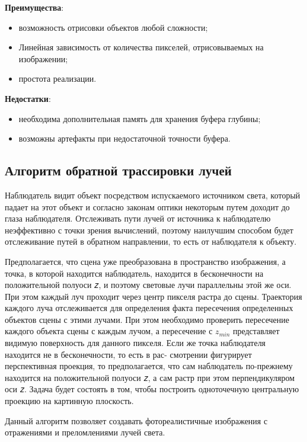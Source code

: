 \textbf{Преимущества}:
\begin{itemize}
    \item возможность отрисовки объектов любой сложности;
    \item Линейная зависимость от количества пикселей, отрисовываемых на изображении;
    \item простота реализации.
\end{itemize}

\textbf{Недостатки}:
\begin{itemize}
    \item необходима дополнительная память для хранения буфера глубины;
    \item возможны артефакты при недостаточной точности буфера.
\end{itemize}


\subsection{Алгоритм обратной трассировки лучей}

Наблюдатель видит объект посредством испускаемого источником света,
который падает на этот объект и согласно законам оптики некоторым путем доходит
до глаза наблюдателя. Отслеживать пути лучей от источника
к наблюдателю неэффективно с точки зрения вычислений, поэтому наилучшим
способом будет отслеживание путей в обратном направлении, то есть от
наблюдателя к объекту.

Предполагается, что сцена уже преобразована в пространство изображения,
а точка, в которой находится наблюдатель, находится в бесконечности
на положительной полуоси 𝑧, и поэтому световые лучи параллельны этой же
оси. При этом каждый луч проходит через центр пикселя растра до сцены.
Траектория каждого луча отслеживается для определения факта пересечения
определенных объектов сцены с этими лучами. При этом необходимо
проверить пересечение каждого объекта сцены с каждым лучом, а пересечение
с $z_{min}$ представляет видимую поверхность для данного пикселя.
Если же точка наблюдателя находится не в бесконечности, то есть в рас-
смотрении фигурирует перспективная проекция, то предполагается, что сам
наблюдатель по-прежнему находится на положительной полуоси 𝑧, а сам
растр при этом перпендикуляром оси 𝑧. Задача будет состоять в том, чтобы
построить одноточечную центральную проекцию на картинную плоскость.


Данный алгоритм позволяет создавать фотореалистичные изображения с отражениями
и преломлениями лучей света.


